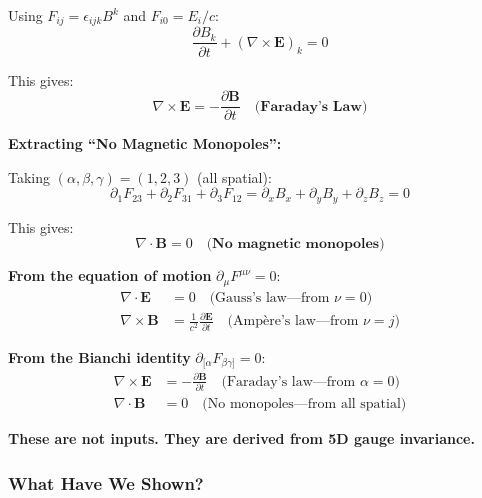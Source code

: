 Using $F_{ij} = \epsilon_{ijk}B^k$ and $F_{i0} = E_i/c$:
\begin{equation}
\frac{\partial B_k}{\partial t} + (\nabla \times \mathbf{E})_k = 0
\end{equation}

This gives:
\begin{equation}
\boxed{\nabla \times \mathbf{E} = -\frac{\partial \mathbf{B}}{\partial t}} \quad \textbf{(Faraday's Law)}
\end{equation}

\textbf{Extracting ``No Magnetic Monopoles'':}

Taking $(\alpha, \beta, \gamma) = (1, 2, 3)$ (all spatial):
\begin{equation}
\partial_1 F_{23} + \partial_2 F_{31} + \partial_3 F_{12} = \partial_x B_x + \partial_y B_y + \partial_z B_z = 0
\end{equation}

This gives:
\begin{equation}
\boxed{\nabla \cdot \mathbf{B} = 0} \quad \textbf{(No magnetic monopoles)}
\end{equation}

\begin{tcolorbox}[colback=green!5,colframe=green!60!black,title=Summary: All Four Maxwell Equations Derived]

\textbf{From the equation of motion} $\partial_\mu F^{\mu\nu} = 0$:
\begin{align}
\nabla \cdot \mathbf{E} &= 0 \quad \text{(Gauss's law---from } \nu = 0\text{)} \\
\nabla \times \mathbf{B} &= \frac{1}{c^2}\frac{\partial \mathbf{E}}{\partial t} \quad \text{(Ampère's law---from } \nu = j\text{)}
\end{align}

\textbf{From the Bianchi identity} $\partial_{[\alpha} F_{\beta\gamma]} = 0$:
\begin{align}
\nabla \times \mathbf{E} &= -\frac{\partial \mathbf{B}}{\partial t} \quad \text{(Faraday's law---from } \alpha = 0\text{)} \\
\nabla \cdot \mathbf{B} &= 0 \quad \text{(No monopoles---from all spatial)}
\end{align}

\textbf{These are not inputs. They are derived from 5D gauge invariance.}
\end{tcolorbox}

\subsubsection{What Have We Shown?}


